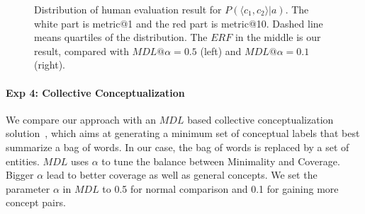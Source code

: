 %
%
\begin{figure}[!b]
\centering
\footnotesize
{}
\vspace{-8mm}
\caption{\small Distribution of human evaluation result for $P(\langle c_1,c_2 \rangle|a)$. \footnotesize The white part is metric@1 and the red part is metric@10. Dashed line means quartiles of the distribution. The $ERF$ in the middle is our result, compared with $MDL@\alpha=0.5$ (left) and $MDL@\alpha=0.1$(right). }
\label{fig:eva_violin_pc1c2ga}
\vspace{-4mm}
\end{figure}

%
%

\vspace{-4mm}
\paragraph*{Exp 4: Collective Conceptualization}
We compare our approach with an $MDL$ based collective conceptualization solution~\cite{sunconceptual}, which aims at generating a minimum set of conceptual labels that best summarize a bag of words.
In our case, the bag of words is replaced by a set of entities.
$MDL$ uses $\alpha$ to tune the balance between \ac{Minimality} and \ac{Coverage}. 
Bigger $\alpha$ lead to better coverage as well as general concepts.
We set the parameter $\alpha$ in $MDL$ to 0.5 for normal comparison and 0.1 for gaining more concept pairs.

